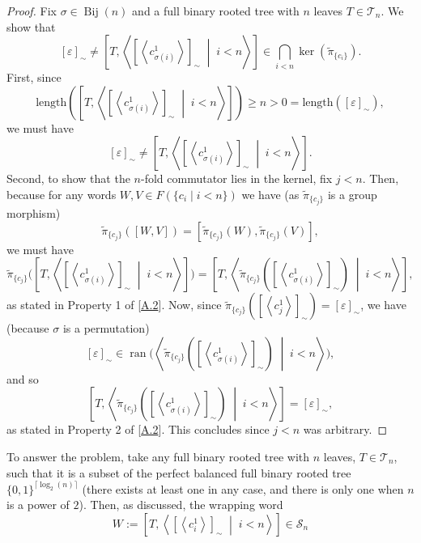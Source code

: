 \documentclass[11pt, a4paper, oneside]{article}
\theoremstyle{remark}
\theoremstyle{lemma}
\begin{document}
\begin{proof}
Fix \(\sigma \in \operatorname{Bij}(n)\) and a full binary rooted tree with \(n\) leaves \(T \in \mathcal{T}_n\). 
We show that 
\[
[\varepsilon]_{\sim}\neq \left[ T, \left\langle \left[ \left\langle c_{\sigma(i)}^1 \right\rangle \right]_{\sim} \;\middle|\; i<n \right\rangle \right] 
\in \bigcap_{i<n} \ker\!\left( \tilde{\pi}_{\{c_i\}} \right).
\]
First, since
\[
\mathrm{length}\!\left(\left[ T, \left\langle \left[ \left\langle c_{\sigma(i)}^1 \right\rangle \right]_{\sim} \;\middle|\; i<n \right\rangle \right]\right) \geq n>0=\mathrm{length}([\varepsilon]_{\sim}),
\]
we must have
\[
[\varepsilon]_{\sim} \neq \left[ T, \left\langle \left[ \left\langle c_{\sigma(i)}^1 \right\rangle \right]_{\sim} \;\middle|\; i<n \right\rangle \right].
\]
Second, to show that the $n$-fold commutator lies in the kernel, fix \(j<n\).
 Then, because for any words \(W, V \in F(\{c_i \mid i<n\})\) we have (as \(\tilde{\pi}_{\{c_j\}}\) is a group morphism)
\[
\tilde{\pi}_{\{c_j\}}([W,V]) = \left[\tilde{\pi}_{\{c_j\}}(W), \tilde{\pi}_{\{c_j\}}(V)\right],
\] 
we must have
\[
\tilde{\pi}_{\{c_j\}} \Big( \left[ T, \left\langle \left[ \left\langle c_{\sigma(i)}^1 \right\rangle \right]_{\sim} \;\middle|\; i<n \right\rangle \right] \Big) 
= \left[ T, \left\langle \tilde{\pi}_{\{c_j\}} \left( \left[ \left\langle c_{\sigma(i)}^1 \right\rangle \right]_{\sim} \right) \;\middle|\; i<n \right\rangle \right],
\] 
as stated in Property 1 of [\hyperref[A2]{A.2}]. Now, since \(\tilde{\pi}_{\{c_j\}} \left( \left[ \left\langle c_j^1 \right\rangle \right]_{\sim} \right) =[\varepsilon]_{\sim}\), we have (because $\sigma$ is a permutation)
\[
[\varepsilon]_{\sim} \in \operatorname{ran} \Big( \left\langle \tilde{\pi}_{\{c_j\}} \left( \left[ \left\langle c_{\sigma(i)}^1 \right\rangle \right]_{\sim} \right) \;\middle|\; i<n \right\rangle \Big),
\] 
and so
\[
\left[ T, \left\langle \tilde{\pi}_{\{c_j\}} \left( \left[ \left\langle c_{\sigma(i)}^1 \right\rangle \right]_{\sim} \right) \;\middle|\; i<n \right\rangle  \right] = [\varepsilon]_{\sim},
\] 
as stated in Property 2 of [\hyperref[A2]{A.2}]. This concludes since \(j<n\) was arbitrary. 
\end{proof}
To answer the problem, take any full binary rooted tree with $n$ leaves, $T \in \mathcal{T}_n$, such that it is a subset of the perfect balanced full binary rooted tree $\{0,1\}^{\lceil \log_2(n) \rceil}$ (there exists at least one in any case, and there is only one when $n$ is a power of $2$). Then, as discussed, the wrapping word
\[
W := \left[ T, \left\langle \left[ \left\langle c_i^1 \right\rangle \right]_{\sim} \;\middle|\; i<n \right\rangle \right] \in \mathcal{S}_n
\]
\end{document}

